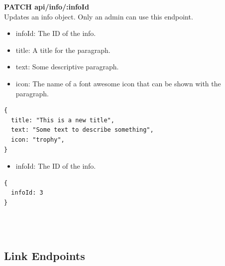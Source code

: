 \documentclass[onecolumn, draftclsnofoot,10pt, compsoc, usenames, dvipsnames]{IEEEtran}
\begin{document}
\noindent
\textbf{\textcolor{BlueGreen}{PATCH} api/info/:infoId} \\
Updates an info object. Only an admin can use this endpoint.
\begin{itemize}
    \item infoId: The ID of the info.
    \item title: A title for the paragraph.
    \item text: Some descriptive paragraph.
    \item icon: The name of a font awesome icon that can be shown with the paragraph.
\end{itemize}
\begin{lstlisting}[caption=Example Request Body]
{
  title: "This is a new title",
  text: "Some text to describe something",
  icon: "trophy",
}
\end{lstlisting}
\begin{itemize}
  \item infoId: The ID of the info.
\end{itemize}
\begin{lstlisting}[caption=Example Response]
{ 
  infoId: 3
}
\end{lstlisting}
\\~\\


\subsection{Link Endpoints}
\end{document}
